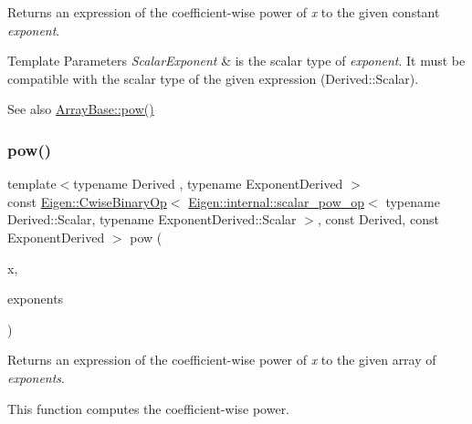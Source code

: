 \begin{DoxyReturn}{Returns}
an expression of the coefficient-\/wise power of {\itshape x} to the given constant {\itshape exponent}.
\end{DoxyReturn}

\begin{DoxyTemplParams}{Template Parameters}
{\em Scalar\+Exponent} & is the scalar type of {\itshape exponent}. It must be compatible with the scalar type of the given expression ({\ttfamily Derived\+::\+Scalar}).\\
\hline
\end{DoxyTemplParams}
\begin{DoxySeeAlso}{See also}
\mbox{\hyperlink{class_eigen_1_1_array_base_ab6dc101d82e8228a19a8840e3a29c1c9}{Array\+Base\+::pow()}} 
\end{DoxySeeAlso}
\mbox{\label{class_eigen_1_1_array_base_acb769e1ab1d809abb77c7ab98021ad81}} 
\subsubsection{\texorpdfstring{pow()}{pow()}\hspace{0.1cm}{\footnotesize\ttfamily [2/3]}}
{\footnotesize\ttfamily template$<$typename Derived , typename Exponent\+Derived $>$ \\
const \mbox{\hyperlink{class_eigen_1_1_cwise_binary_op}{Eigen\+::\+Cwise\+Binary\+Op}}$<$ \mbox{\hyperlink{struct_eigen_1_1internal_1_1scalar__pow__op}{Eigen\+::internal\+::scalar\+\_\+pow\+\_\+op}}$<$ typename Derived\+::\+Scalar, typename Exponent\+Derived\+::\+Scalar $>$, const Derived, const Exponent\+Derived $>$ pow (\begin{DoxyParamCaption}\item[{const \mbox{\hyperlink{class_eigen_1_1_array_base}{Eigen\+::\+Array\+Base}}$<$ Derived $>$ \&}]{x,  }\item[{const \mbox{\hyperlink{class_eigen_1_1_array_base}{Eigen\+::\+Array\+Base}}$<$ Exponent\+Derived $>$ \&}]{exponents }\end{DoxyParamCaption})\hspace{0.3cm}{\ttfamily [related]}}

\begin{DoxyReturn}{Returns}
an expression of the coefficient-\/wise power of {\itshape x} to the given array of {\itshape exponents}.
\end{DoxyReturn}
This function computes the coefficient-\/wise power.

